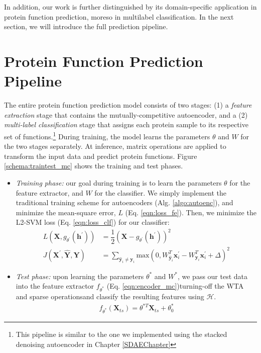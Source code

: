 \par In addition, our work is further distinguished by its domain-specific
application in protein function prediction, moreso in multilabel
classification. In the next section, we will introduce the full prediction
pipeline.

\section{Protein Function Prediction Pipeline}
\label{PFPPipeline}

\par The entire protein function prediction model consists of two stages: (1)
a \textit{feature extraction} stage that contains the mutually-competitive
autoencoder, and a (2) \textit{multi-label classification} stage that assigns
each protein sample to its respective set of functions.\footnote{This
pipeline is similar to the one we implemented using the stacked denoising
autoencoder in Chapter \ref{SDAEChapter}} During training, the model learns
the parameters $\theta$ and $W$ for the two stages separately. At inference,
matrix operations are applied to transform the input data and predict protein
functions. Figure \ref{schema:traintest_mc} shows the training and test
phases.

\begin{itemize}
  \item \textit{Training phase:} our goal during training is to learn the
  parameters $\theta$ for the feature extractor, and $W$ for the classifier.
  We simply implement the traditional training scheme for autoencoders (Alg.
  \ref{algo:autoenc}), and minimize the mean-square error, $L$ (Eq.
  \ref{eqn:loss_fe}). Then, we minimize the L2-SVM loss (Eq.
  \ref{eqn:loss_clf}) for our classifier:
  \begin{align}
    \label{eqn:loss_fe}
    L(\mathbf{X},g_{\theta^{\prime}}(\mathbf{h}^{\prime})) &=
      \dfrac{1}{2}(\mathbf{X} - g_{\theta^{\prime}}(\mathbf{h}^{\prime}))^{2}\\
    \label{eqn:loss_clf}
    J(\mathbf{X}^{\prime}, \widehat{\mathbf{Y}}, \mathbf{Y}) &= \sum_{\widehat{\mathbf{y}}_i \neq \mathbf{y}_{i}} \text{max}(0, W^{T}_{\widehat{\mathbf{y}}_{i}} \mathbf{x}_{i}^{\prime} - W^{T}_{\mathbf{y}_i}\mathbf{x}^{\prime}_i + \Delta)^2
  \end{align}
  \item \textit{Test phase:} upon learning the parameters $\theta^{\ast}$ and
  $W^{\ast}$, we pass our test data into the feature extractor
  $f_{\theta^{\ast}}$ (Eq. \ref{eqn:encoder_mc})\textemdash turning-off the WTA and sparse
  operations\textemdash and classify the resulting features using
  $\mathcal{H}$.
  \begin{align}
    \label{eqn:encoder_mc}
    f_{\theta^{\ast}}(\mathbf{X}_{ts}) = \theta^{\ast T} \mathbf{X}_{ts} + \theta_{0}^{\ast}
  \end{align}
\end{itemize}

